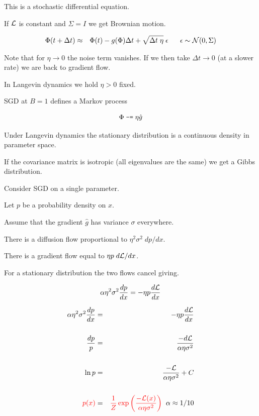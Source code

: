 {\vfill
This is a stochastic differential equation.

\vfill
If ${\cal L}$ is constant and $\Sigma = I$ we get Brownian motion.


\begin{eqnarray*}
\Phi(t + \Delta t) & \approx & \Phi(t) -g(\Phi)\Delta t + \sqrt{\Delta t\; \eta}\;\epsilon\;\;\;\;\;\; \epsilon \sim {\cal N}(0,\Sigma)
\end{eqnarray*}

\vfill
Note that for $\eta \rightarrow 0$ the noise term vanishes.  If we then take $\Delta t \rightarrow 0$ (at a slower rate) we are back to gradient flow.

\vfill
In Langevin dynamics we hold $\eta > 0 $ fixed.


SGD at $B = 1$ defines a Markov process

$$\Phi \;\mbox{\tt -=} \; \eta \hat{g}$$

\vfill
Under Langevin dynamics the stationary distribution is a continuous density in parameter space.

\vfill
If the covariance matrix is isotropic (all eigenvalues are the same) we get a Gibbs distribution.



Consider SGD on a single parameter.

\vfill
Let $p$ be a probability density on $x$.

\vfill
Assume that the gradient $\hat{g}$ has variance $\sigma$ everywhere.

\vfill
There is a diffusion flow proportional to $\eta^2\sigma^2\;dp/dx$.

\vfill
There is a gradient flow equal to $\eta p \;d {\cal L}/dx$.

\vfill
For a stationary distribution the two flows cancel giving.

\vfill
{\color{red} $$\alpha \eta^2 \sigma^2 \frac{dp}{dx} = - \eta p\frac{d{\cal L}}{dx}$$}



\vspace{-2ex}
\begin{eqnarray*}
\alpha \eta^2 \sigma^2 \frac{dp}{dx} & = & - \eta p\frac{d{\cal L}}{dx} \\
\\
\frac{dp}{p} & = & \frac{-d{\cal L}}{\alpha\eta\sigma^2} \\
\\
\ln p & = & \frac{-{\cal L}}{\alpha \eta \sigma^2} + C \\
\\
{\color{red} p(x)} & = & {\color{red} \frac{1}{Z}\exp\left(\frac{-{\cal L}(x)}{\alpha \eta \sigma^2}\right)}\;\;\alpha \approx 1/10
\end{eqnarray*}

}
